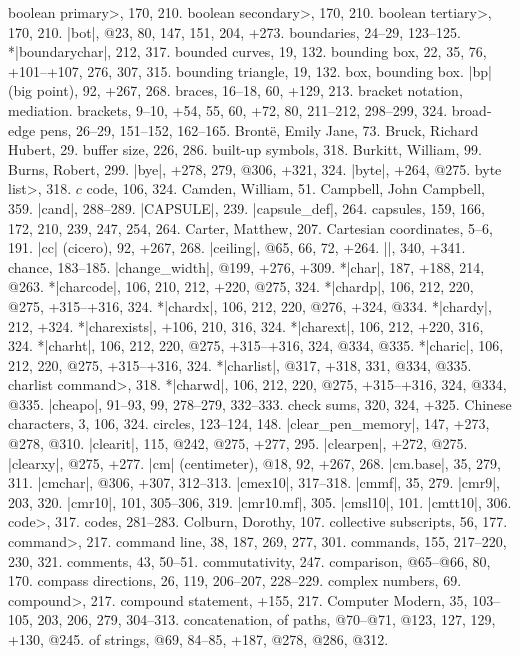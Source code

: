 \<boolean primary>, 170, 210.
\<boolean secondary>, 170, 210.
\<boolean tertiary>, 170, 210.
|bot|, @23, 80, 147, 151, 204, +273.
boundaries, 24--29, 123--125.
*|boundarychar|, 212, 317.
bounded curves, 19, 132.
bounding box, 22, 35, 76, +101--+107, 276, 307, 315.
bounding triangle, 19, 132.
box, \see bounding box.
|bp| (big point), 92, +267, 268.
braces, 16--18, 60, +129, 213.
bracket notation, \see mediation.
brackets, 9--10, +54, 55, 60, +72, 80, 211--212, 298--299, 324.
broad-edge pens, 26--29, 151--152, 162--165.
Bront\"e, Emily Jane, 73.
Bruck, Richard Hubert, 29.
buffer size, 226, 286.
built-up symbols, 318.
Burkitt, William, 99.
Burns, Robert, 299.
|bye|, +278, 279, @306, +321, 324.
|byte|, +264, @275.
\<byte list>, 318.
\newletter
$c$ code, 106, 324.
Camden, William, 51.
Campbell, John Campbell, 359.
|cand|, 288--289.
|CAPSULE|, 239.
|capsule_def|, 264.
capsules, 159, 166, 172, 210, 239, 247, 254, 264.
Carter, Matthew, 207.
Cartesian coordinates, 5--6, 191.
|cc| (cicero), 92, +267, 268.
|ceiling|, @65, 66, 72, +264.
|\centerlargechars|, 340, +341.
chance, 183--185.
|change_width|, @199, +276, +309.
*|char|, 187, +188, 214, @263.
*|charcode|, 106, 210, 212, +220, @275, 324.
*|chardp|, 106, 212, 220, @275, +315--+316, 324.
*|chardx|, 106, 212, 220, @276, +324, @334.
*|chardy|, 212, +324.
*|charexists|, +106, 210, 316, 324.
*|charext|, 106, 212, +220, 316, 324.
*|charht|, 106, 212, 220, @275, +315--+316, 324, @334, @335.
*|charic|, 106, 212, 220, @275, +315--+316, 324.
*|charlist|, @317, +318, 331, @334, @335.
\<charlist command>, 318.
*|charwd|, 106, 212, 220, @275, +315--+316, 324, @334, @335.
|cheapo|, 91--93, 99, 278--279, 332--333.
check sums, 320, 324, +325.
Chinese characters, 3, 106, 324.
circles, 123--124, 148.
|clear_pen_memory|, 147, +273, @278, @310.
|clearit|, 115, @242, @275, +277, 295.
|clearpen|, +272, @275.
|clearxy|, @275, +277.
|cm| (centimeter), @18, 92, +267, 268.
|cm.base|, 35, 279, 311.
|cmchar|, @306, +307, 312--313.
|cmex10|, 317--318.
|cmmf|, 35, 279.
|cmr9|, 203, 320.
|cmr10|, 101, 305--306, 319.
|cmr10.mf|, 305.
|cmsl10|, 101.
|cmtt10|, 306.
\<code>, 317.
codes, 281--283.
Colburn, Dorothy, 107.
collective subscripts, 56, 177.
\<command>, 217.
command line, 38, 187, 269, 277, 301.
commands, 155, 217--220, 230, 321.
comments, 43, 50--51.
commutativity, 247.
comparison, @65--@66, 80, 170.
compass directions, 26, 119, 206--207, 228--229.
complex numbers, 69.
\<compound>, 217.
compound statement, +155, 217.
Computer Modern, 35, 103--105, 203, 206, 279, 304--313.
concatenation, of paths, @70--@71, @123, 127, 129, +130, @245.
\sub of strings, @69, 84--85, +187, @278, @286, @312.

